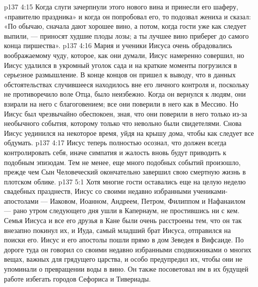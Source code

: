 \vs p137 4:15 \pc Когда слуги зачерпнули этого нового вина и принесли его шаферу, «правителю праздника» и когда он попробовал его, то подозвал жениха и сказал: «По обычаю, сначала дают хорошее вино, а потом, когда гости уже как следует выпили, --- приносят худшие плоды лозы; а ты лучшее вино приберег до самого конца пиршества».
\vs p137 4:16 Мария и ученики Иисуса очень обрадовались воображаемому чуду, которое, как они думали, Иисус намеренно совершил, но Иисус удалился в укромный уголок сада и на краткие моменты погрузился в серьезное размышление. В конце концов он пришел к выводу, что в данных обстоятельствах случившееся находилось вне его личного контроля и, поскольку не противоречило воле Отца, было неизбежно. Когда он вернулся к людям, они взирали на него с благоговением; все они поверили в него как в Мессию. Но Иисус был чрезвычайно обеспокоен, зная, что они поверили в него только из\hyp{}за необычного события, которому только что невольно были свидетелями. Снова Иисус уединился на некоторое время, уйдя на крышу дома, чтобы как следует все обдумать.
\vs p137 4:17 Иисус теперь полностью осознал, что должен всегда контролировать себя, иначе симпатия и жалость вновь будут приводить к подобным эпизодам. Тем не менее, еще много подобных событий произошло, прежде чем Сын Человеческий окончательно завершил свою смертную жизнь в плотском облике.
\vs p137 5:1 Хотя многие гости оставались еще на целую неделю свадебных празднеств, Иисус со своими недавно избранными учениками\hyp{}апостолами --- Иаковом, Иоанном, Андреем, Петром, Филиппом и Нафанаилом --- рано утром следующего дня ушли в Капернаум, не простившись ни с кем. Семья Иисуса и все его друзья в Кане были очень расстроены тем, что он так внезапно покинул их, и Иуда, самый младший брат Иисуса, отправился на поиски его. Иисус и его апостолы пошли прямо в дом Зеведея в Вифсаиде. По дороге туда он говорил со своими недавно избранными сподвижниками о многих вещах, важных для грядущего царства, и особо предупредил их, чтобы они не упоминали о превращении воды в вино. Он также посоветовал им в их будущей работе избегать городов Сефориса и Тивериады.
